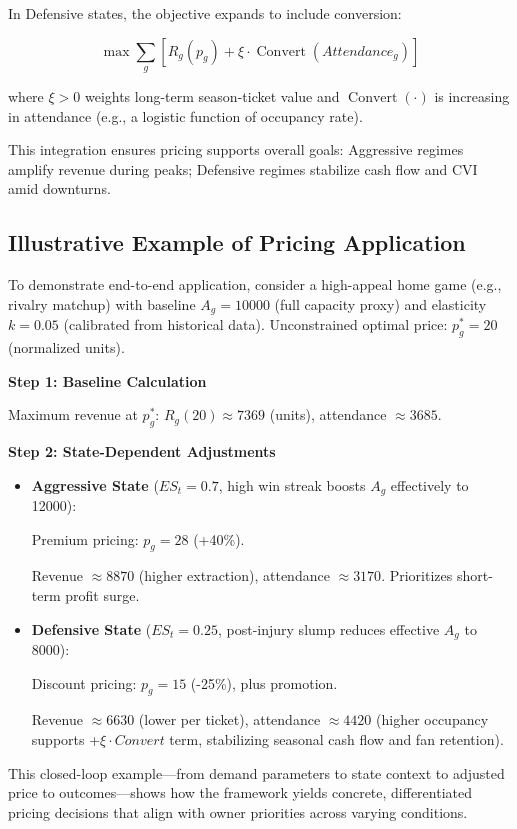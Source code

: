 \documentclass{mcmthesis}
\begin{document}
In Defensive states, the objective expands to include conversion:

\[
\max \sum_g \left[ R_g(p_g) + \xi \cdot \operatorname{Convert}(Attendance_g) \right]
\]

where $\xi > 0$ weights long-term season-ticket value and
$\operatorname{Convert}(\cdot)$ is increasing in attendance
(e.g., a logistic function of occupancy rate).

This integration ensures pricing supports overall goals: Aggressive regimes amplify revenue during peaks; Defensive regimes stabilize cash flow and CVI amid downturns.

\subsection{Illustrative Example of Pricing Application}
To demonstrate end-to-end application, consider a high-appeal home game (e.g., rivalry matchup) with baseline $A_g = 10000$ (full capacity proxy) and elasticity $k = 0.05$ (calibrated from historical data). Unconstrained optimal price: $p_g^* = 20$ (normalized units).

\textbf{Step 1: Baseline Calculation}

Maximum revenue at $p_g^*$: $R_g(20) \approx 7369$ (units), attendance $\approx 3685$.

\textbf{Step 2: State-Dependent Adjustments}

\begin{itemize}
    \item \textbf{Aggressive State} ($ES_t = 0.7$, high win streak boosts $A_g$ effectively to 12000):
    
    Premium pricing: $p_g = 28$ (+40\%).
    
    Revenue $\approx 8870$ (higher extraction), attendance $\approx 3170$. Prioritizes short-term profit surge.
    
    \item \textbf{Defensive State} ($ES_t = 0.25$, post-injury slump reduces effective $A_g$ to 8000):
    
    Discount pricing: $p_g = 15$ (-25\%), plus promotion.
    
    Revenue $\approx 6630$ (lower per ticket), attendance $\approx 4420$ (higher occupancy supports +$\xi \cdot Convert$ term, stabilizing seasonal cash flow and fan retention).
\end{itemize}

This closed-loop example—from demand parameters to state context to adjusted price to outcomes—shows how the framework yields concrete, differentiated pricing decisions that align with owner priorities across varying conditions.
\end{document}
